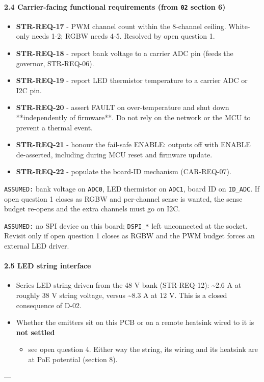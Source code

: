 \documentclass[11pt,a4paper]{article}
\begin{document}
\paragraph*{2.4 Carrier-facing functional requirements (from \texttt{02} section 6)}
\begin{itemize}
\item \textbf{STR-REQ-17} - PWM channel count within the 8-channel ceiling. White-only needs 1-2;
RGBW needs 4-5. Resolved by open question 1.
\item \textbf{STR-REQ-18} - report bank voltage to a carrier ADC pin (feeds the governor, STR-REQ-06).
\item \textbf{STR-REQ-19} - report LED thermistor temperature to a carrier ADC or I2C pin.
\item \textbf{STR-REQ-20} - assert FAULT on over-temperature and shut down {*}{*}independently of
firmware{*}{*}. Do not rely on the network or the MCU to prevent a thermal event.
\item \textbf{STR-REQ-21} - honour the fail-safe ENABLE: outputs off with ENABLE de-asserted,
including during MCU reset and firmware update.
\item \textbf{STR-REQ-22} - populate the board-ID mechanism (CAR-REQ-07).
\end{itemize}
\texttt{ASSUMED:} bank voltage on \texttt{ADC0}, LED thermistor on \texttt{ADC1}, board ID on \texttt{ID\_ADC}. If open question 1 closes as RGBW and per-channel sense is wanted, the sense budget re-opens and the extra channels must go on I2C.

\texttt{ASSUMED:} no SPI device on this board; \texttt{DSPI\_{*}} left unconnected at the socket. Revisit only if open question 1 closes as RGBW and the PWM budget forces an external LED driver.

\paragraph*{2.5 LED string interface}
\begin{itemize}
\item Series LED string driven from the 48 V bank (STR-REQ-12): \textasciitilde{}2.6 A at roughly 38 V string
voltage, versus \textasciitilde{}8.3 A at 12 V. This is a closed consequence of D-02.
\item Whether the emitters sit on this PCB or on a remote heatsink wired to it is \textbf{not settled}
\begin{itemize}
\item see open question 4. Either way the string, its wiring and its heatsink are at PoE
potential (section 8).
\end{itemize}
\end{itemize}
---
\end{document}
